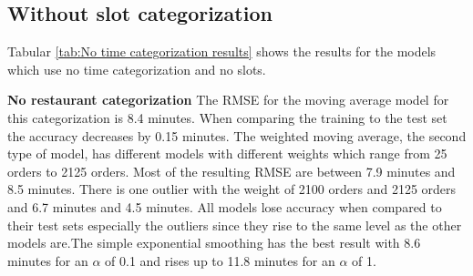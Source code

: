 \subsection{Without slot categorization}
Tabular \ref{tab:No time categorization results} shows the results for the models which use no time categorization and no slots.
\begin{table}[h]
\centering
\caption{No time and slot categorization}
\label{tab:No time categorization results}
\end{table}
\newline\newline\textbf{No restaurant categorization}\newline
The RMSE for the moving average model for this categorization is 8.4 minutes. When comparing the training to the test set the accuracy decreases by 0.15 minutes. The weighted moving average, the second type of model, has different models with different weights which range from 25 orders to 2125 orders. Most of the resulting RMSE are between 7.9 minutes and 8.5 minutes. There is one outlier with the weight of 2100 orders and 2125 orders and 6.7 minutes and 4.5 minutes. All models lose accuracy when compared to their test sets especially the outliers since they rise to the same level as the other models are.\newline The simple exponential smoothing has the best result with 8.6 minutes for an $\alpha$ of 0.1 and rises up to 11.8 minutes for an $\alpha$ of 1.
